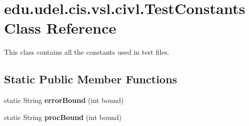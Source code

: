 \hypertarget{classedu_1_1udel_1_1cis_1_1vsl_1_1civl_1_1TestConstants}{}\section{edu.\+udel.\+cis.\+vsl.\+civl.\+Test\+Constants Class Reference}
\label{classedu_1_1udel_1_1cis_1_1vsl_1_1civl_1_1TestConstants}


This class contains all the constants used in test files.  


\subsection*{Static Public Member Functions}
\begin{DoxyCompactItemize}
\item 
\hypertarget{classedu_1_1udel_1_1cis_1_1vsl_1_1civl_1_1TestConstants_acb258737da07ce049c660b9c31884f2e}{}static String {\bfseries error\+Bound} (int bound)\label{classedu_1_1udel_1_1cis_1_1vsl_1_1civl_1_1TestConstants_acb258737da07ce049c660b9c31884f2e}

\item 
\hypertarget{classedu_1_1udel_1_1cis_1_1vsl_1_1civl_1_1TestConstants_aac701db46fa99cbd7d0867989fc2b0c7}{}static String {\bfseries proc\+Bound} (int bound)\label{classedu_1_1udel_1_1cis_1_1vsl_1_1civl_1_1TestConstants_aac701db46fa99cbd7d0867989fc2b0c7}

\end{DoxyCompactItemize}

